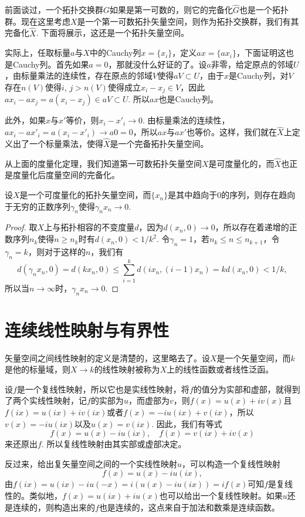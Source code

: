 \begin{para}
	前面谈过，一个拓扑交换群$G$如果是第一可数的，则它的完备化$\hat{G}$也是一个拓扑群。现在这里考虑$X$是一个第一可数拓扑矢量空间，则作为拓扑交换群，我们有其完备化$\hat{X}$. 下面将展示，这还是一个拓扑矢量空间。

	实际上，任取标量$a$与$X$中的Cauchy列$x=\{x_i\}$，定义$ax=\{ax_i\}$，下面证明这也是Cauchy列。首先如果$a=0$，那就没什么好证的了。设$a$非零，给定原点的邻域$U$，由标量乘法的连续性，存在原点的邻域$V$使得$aV\subset U$，由于$x$是Cauchy列，对$V$存在$n(V)$使得$i$, $j>n(V)$使得成立$x_i-x_j\in V$，因此$ax_i-ax_j=a(x_i-x_j)\in aV\subset U$. 所以$ax$也是Cauchy列。

	此外，如果$x$与$x'$等价，则$x_i-x'_i\to 0$. 由标量乘法的连续性，$ax_i-ax'_i=a(x_i-x'_i)\to a0=0$，所以$ax$与$ax'$也等价。这样，我们就在$\hat{X}$上定义出了一个标量乘法，使得$\hat{X}$是一个完备拓扑矢量空间。

	从上面的度量化定理，我们知道第一可数拓扑矢量空间$X$是可度量化的，而$\hat{X}$也正是度量化后度量空间的完备化。
\end{para}

\begin{pro}\label{p.fsdfas}
	设$X$是一个可度量化的拓扑矢量空间，而$\{x_n\}$是其中趋向于$0$的序列，则存在趋向于无穷的正数序列$\gamma_n$使得$\gamma_n x_n \to 0$. 
\end{pro}

\begin{proof}
	取$X$上与拓扑相容的不变度量$d$，因为$d(x_n,0)\to 0$，所以存在着递增的正数序列$n_k$使得$n\geq n_k$时有$d(x_n,0)<1/k^2$. 令$\gamma_n=1$，若$n_k\leq n\leq n_{k+1}$，令$\gamma_n=k$，则对于这样的$n$，我们有
	\[
	d(\gamma_nx_n,0)=d(kx_n,0)\leq \sum_{i=1}^k d(ix_n,(i-1)x_n)=kd(x_n,0)<1/k,
	\]
	所以当$n\to \infty$时，$\gamma_nx_n\to 0$.
\end{proof}

\section{连续线性映射与有界性}

矢量空间之间线性映射的定义是清楚的，这里略去了。设$X$是一个矢量空间，而$k$是他的标量域，则$X\to k$的线性映射被称为$X$上的线性函数或者线性泛函。

\begin{para}
	设$f$是一个复线性映射，所以它也是实线性映射，将$f$的值分为实部和虚部，就得到了两个实线性映射，记$f$的实部为$u$，而虚部为$v$，则$f(x)=u(x)+iv(x)$且$f(ix)=u(ix)+iv(ix)$或者$f(x)=-iu(ix)+v(ix)$，所以$v(x)=-iu(ix)$以及$u(x)=v(ix)$. 因此，我们有等式
	\[
	f(x)=u(x)-i u(i x),\quad f(x)=v(ix)+iv(x)
	\]
	来还原出$f$. 所以复线性映射由其实部或虚部决定。

	反过来，给出复矢量空间之间的一个实线性映射$u$，可以构造一个复线性映射
	\[
		f(x)=u(x)-iu(i x),
	\]
	由$f(ix)=u(ix)-iu(-x)=i(u(x)-i u(ix))=if(x)$可知$f$是复线性的。类似地，$f(x)=u(ix)+iu(x)$也可以给出一个复线性映射。如果$u$还是连续的，则构造出来的$f$也是连续的，这点来自于加法和数乘是连续函数。
\end{para}

